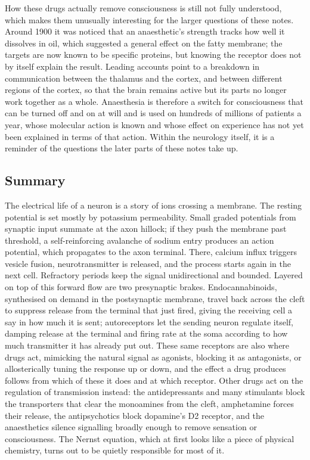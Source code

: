 \documentclass[11pt]{article}
\begin{document}
How these drugs actually remove consciousness is still not fully understood, which makes them unusually interesting for the larger questions of these notes. Around 1900 it was noticed that an anaesthetic's strength tracks how well it dissolves in oil, which suggested a general effect on the fatty membrane; the targets are now known to be specific proteins, but knowing the receptor does not by itself explain the result. Leading accounts point to a breakdown in communication between the thalamus and the cortex, and between different regions of the cortex, so that the brain remains active but its parts no longer work together as a whole. Anaesthesia is therefore a switch for consciousness that can be turned off and on at will and is used on hundreds of millions of patients a year, whose molecular action is known and whose effect on experience has not yet been explained in terms of that action. Within the neurology itself, it is a reminder of the questions the later parts of these notes take up.

\subsection{Summary}

The electrical life of a neuron is a story of ions crossing a membrane. The resting potential is set mostly by potassium permeability. Small graded potentials from synaptic input summate at the axon hillock; if they push the membrane past threshold, a self-reinforcing avalanche of sodium entry produces an action potential, which propagates to the axon terminal. There, calcium influx triggers vesicle fusion, neurotransmitter is released, and the process starts again in the next cell. Refractory periods keep the signal unidirectional and bounded. Layered on top of this forward flow are two presynaptic brakes. Endocannabinoids, synthesised on demand in the postsynaptic membrane, travel back across the cleft to suppress release from the terminal that just fired, giving the receiving cell a say in how much it is sent; autoreceptors let the sending neuron regulate itself, damping release at the terminal and firing rate at the soma according to how much transmitter it has already put out. These same receptors are also where drugs act, mimicking the natural signal as agonists, blocking it as antagonists, or allosterically tuning the response up or down, and the effect a drug produces follows from which of these it does and at which receptor. Other drugs act on the regulation of transmission instead: the antidepressants and many stimulants block the transporters that clear the monoamines from the cleft, amphetamine forces their release, the antipsychotics block dopamine's D2 receptor, and the anaesthetics silence signalling broadly enough to remove sensation or consciousness. The Nernst equation, which at first looks like a piece of physical chemistry, turns out to be quietly responsible for most of it.
\end{document}

